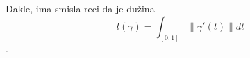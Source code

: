 \documentclass[preview]{standalone}
\begin{document}
\begin{center}
Dakle, ima smisla reci da je dužina \[l(\gamma) = \int_{[0,1]} \lVert \gamma'(t)\rVert dt\].
\end{center}
\end{document}
